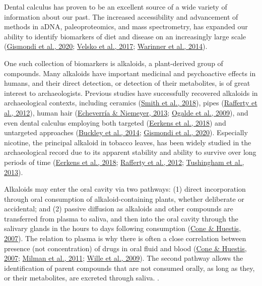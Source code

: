 \documentclass[
  b5paper,
]{book}
\begin{document}
Dental calculus has proven to be an excellent source of a wide variety
of information about our past. The increased accessibility and
advancement of methods in aDNA, paleoproteomics, and mass spectrometry,
has expanded our ability to identify biomarkers of diet and disease on
an increasingly large scale
(\protect\hyperlink{ref-gismondiMultidisciplinaryApproach2020}{Gismondi
et al., 2020}; \protect\hyperlink{ref-velskoDentalCalculus2017}{Velsko
et al., 2017}; \protect\hyperlink{ref-warinnerEvidenceMilk2014}{Warinner
et al., 2014}).

One such collection of biomarkers is alkaloids, a plant-derived group of
compounds. Many alkaloids have important medicinal and psychoactive
effects in humans, and their direct detection, or detection of their
metabolites, is of great interest to archaeologists. Previous studies
have successfully recovered alkaloids in archaeological contexts,
including ceramics
(\protect\hyperlink{ref-smithDetectionOpium2018}{Smith et al., 2018}),
pipes (\protect\hyperlink{ref-raffertyCurrentResearch2012}{Rafferty et
al., 2012}), human hair
(\protect\hyperlink{ref-echeverriaNicotineHair2013}{Echeverría \&
Niemeyer, 2013};
\protect\hyperlink{ref-ogaldeIdentificationPsychoactive2009}{Ogalde et
al., 2009}), and even dental calculus employing both targeted
(\protect\hyperlink{ref-eerkensDentalCalculus2018}{Eerkens et al.,
2018}) and untargeted approaches
(\protect\hyperlink{ref-buckleyDentalCalculus2014}{Buckley et al.,
2014};
\protect\hyperlink{ref-gismondiMultidisciplinaryApproach2020}{Gismondi
et al., 2020}). Especially nicotine, the principal alkaloid in tobacco
leaves, has been widely studied in the archaeological record due to its
apparent stability and ability to survive over long periods of time
(\protect\hyperlink{ref-eerkensDentalCalculus2018}{Eerkens et al.,
2018}; \protect\hyperlink{ref-raffertyCurrentResearch2012}{Rafferty et
al., 2012};
\protect\hyperlink{ref-tushinghamHuntergathererTobacco2013}{Tushingham
et al., 2013}).

Alkaloids may enter the oral cavity via two pathways: (1) direct
incorporation through oral consumption of alkaloid-containing plants,
whether deliberate or accidental; and (2) passive diffusion as alkaloids
and other compounds are transferred from plasma to saliva, and then into
the oral cavity through the salivary glands in the hours to days
following consumption
(\protect\hyperlink{ref-coneInterpretationOral2007}{Cone \& Huestis,
2007}). The relation to plasma is why there is often a close correlation
between presence (not concentration) of drugs in oral fluid and blood
(\protect\hyperlink{ref-coneInterpretationOral2007}{Cone \& Huestis,
2007}; \protect\hyperlink{ref-milmanOralFluid2011}{Milman et al., 2011};
\protect\hyperlink{ref-willeRelationshipOral2009}{Wille et al., 2009}).
The second pathway allows the identification of parent compounds that
are not consumed orally, as long as they, or their metabolites, are
excreted through saliva. .
\end{document}

